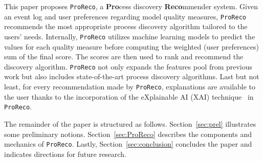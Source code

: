 This paper proposes \texttt{ProReco}, a \textbf{Pro}cess discovery \textbf{Reco}mmender system. 
Given an event log and user preferences regarding model quality measures, \texttt{ProReco} recommends the most appropriate process discovery algorithm tailored to the users' needs. 
Internally, \texttt{ProReco} utilizes machine learning models to predict the values for each quality measure before computing the weighted (user preferences) sum of the final score. 
The scores are then used to rank and recommend the discovery algorithm. 
\texttt{ProReco} not only expands the features pool from previous work but also includes state-of-the-art process discovery algorithms.  
Last but not least, for every recommendation made by \texttt{ProReco}, explanations are available to the user thanks to the incorporation of the eXplainable AI (XAI) technique~\cite{LundbergL17SHAP} in \texttt{ProReco}. 

The remainder of the paper is structured as follows. Section~\ref{sec:prel} illustrates some preliminary notions. Section~\ref{sec:ProReco} describes the components and mechanics of \texttt{ProReco}. Lastly, Section~\ref{sec:conclusion} concludes the paper and indicates directions for future research. 